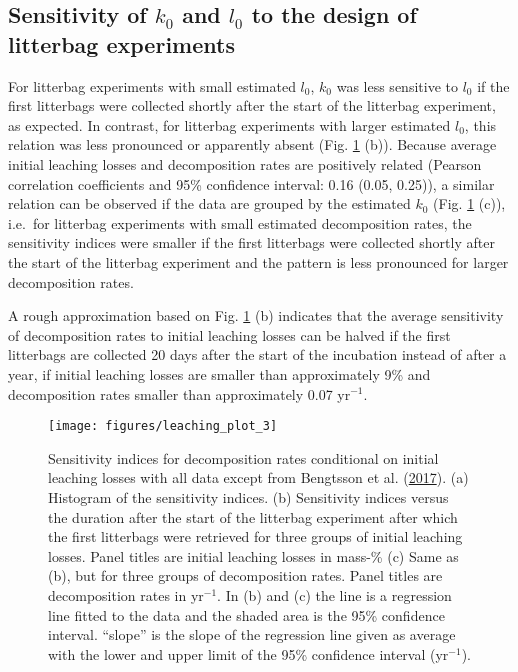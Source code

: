 \documentclass[
  12pt,
]{article}
\begin{document}
\hypertarget{out-res-3}{%
\subsection{\texorpdfstring{Sensitivity of \(k_0\) and \(l_0\) to the design of litterbag experiments}{Sensitivity of k\_0 and l\_0 to the design of litterbag experiments}}\label{out-res-3}}

For litterbag experiments with small estimated \(l_0\), \(k_0\) was less sensitive to \(l_0\) if the first litterbags were collected shortly after the start of the litterbag experiment, as expected. In contrast, for litterbag experiments with larger estimated \(l_0\), this relation was less pronounced or apparently absent (Fig. \ref{fig:out-sdm-ua1-p1-p2} (b)). Because average initial leaching losses and decomposition rates are positively related (Pearson correlation coefficients and 95\% confidence interval: 0.16 (0.05, 0.25)), a similar relation can be observed if the data are grouped by the estimated \(k_0\) (Fig. \ref{fig:out-sdm-ua1-p1-p2} (c)), i.e.~for litterbag experiments with small estimated decomposition rates, the sensitivity indices were smaller if the first litterbags were collected shortly after the start of the litterbag experiment and the pattern is less pronounced for larger decomposition rates.

A rough approximation based on Fig. \ref{fig:out-sdm-ua1-p1-p2} (b) indicates that the average sensitivity of decomposition rates to initial leaching losses can be halved if the first litterbags are collected 20 days after the start of the incubation instead of after a year, if initial leaching losses are smaller than approximately 9\% and decomposition rates smaller than approximately 0.07 yr\(^{-1}\).



\begin{figure}[H]

{\centering \texttt{[image: figures/leaching\_plot\_3]} 

}

\caption{Sensitivity indices for decomposition rates conditional on initial leaching losses with all data except from Bengtsson et al. (\protect\hyperlink{ref-Bengtsson.2017}{2017}). (a) Histogram of the sensitivity indices. (b) Sensitivity indices versus the duration after the start of the litterbag experiment after which the first litterbags were retrieved for three groups of initial leaching losses. Panel titles are initial leaching losses in mass-\% (c) Same as (b), but for three groups of decomposition rates. Panel titles are decomposition rates in yr\(^{-1}\). In (b) and (c) the line is a regression line fitted to the data and the shaded area is the 95\% confidence interval. ``slope'' is the slope of the regression line given as average with the lower and upper limit of the 95\% confidence interval (yr\(^{-1}\)).}\label{fig:out-sdm-ua1-p1-p2}
\end{figure}
\end{document}
